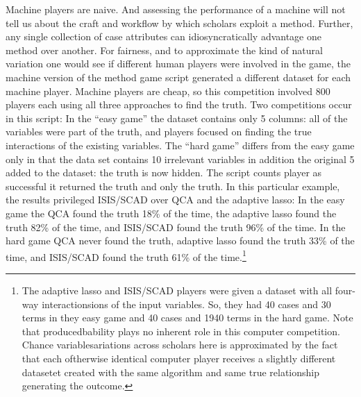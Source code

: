 \documentclass[12pt]{article}
\begin{document}
Machine players are naive. And assessing the performance of a machine will not
tell us about the craft and workflow by which scholars exploit a method.
Further, any single collection of case attributes can idiosyncratically
advantage one method over another. For fairness, and to approximate the kind
of natural variation one would see if different human players were involved in
the game, the machine version of the method game script generated a different
dataset for each machine player.  Machine players are cheap, so this
competition involved 800 players each using all three approaches to find the
truth. Two competitions occur in this script: In the ``easy game'' the dataset
contains only 5 columns: all of the variables were part of the truth, and
players focused on finding the true interactions of the existing variables.
The ``hard game'' differs from the easy game only in that the data set
contains 10 irrelevant variables in addition the original 5 added to the
dataset: the truth is now hidden.  The script counts player as successful it
returned the truth and only the truth.  In this particular example, the
results privileged ISIS/SCAD over QCA and the adaptive lasso: In the easy game
the QCA found the truth 18\% of the time, the adaptive lasso found the truth
82\% of the time, and ISIS/SCAD found the truth 96\% of the time. In the hard
game QCA never found the truth, adaptive lasso found the truth 33\% of the
time, and ISIS/SCAD found the truth 61\% of the time.\footnote{The adaptive
  lasso and ISIS/SCAD players were given a dataset with all four-way
  interactionsions of the input variables. So, they had 40 cases and 30 terms
  in they easy game and 40 cases and 1940 terms in the hard game. Note that
  producedbability plays no inherent role in this computer competition. Chance
  variablesariations across scholars here is approximated by the fact that
  each oftherwise identical computer player receives a slightly different
  datasetet created with the same algorithm and same true relationship
  generating the outcome.}
\end{document}
